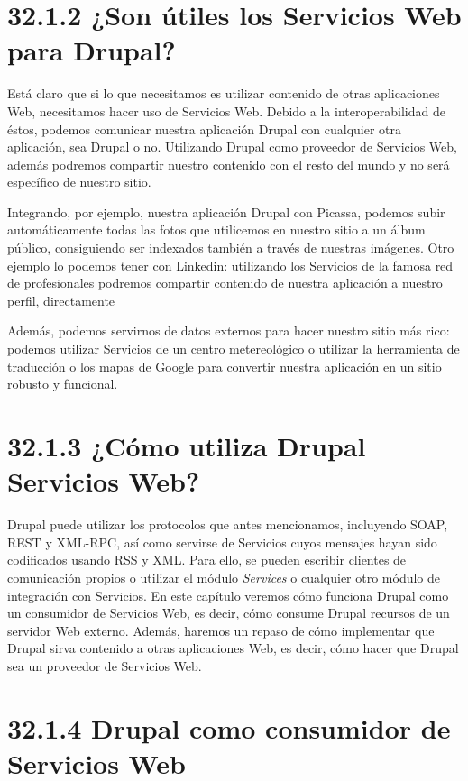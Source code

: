 \section{\Large{32.1.2 ¿Son útiles los Servicios Web para Drupal?}}

Está claro que si lo que necesitamos es utilizar contenido de otras aplicaciones Web, necesitamos hacer 
uso de Servicios Web. Debido a la interoperabilidad de éstos, podemos comunicar nuestra aplicación Drupal 
con cualquier otra aplicación, sea Drupal o no. Utilizando Drupal como proveedor de Servicios Web, además 
podremos compartir nuestro contenido con el resto del mundo y no será específico de nuestro sitio.
 
Integrando, por ejemplo, nuestra aplicación Drupal con Picassa, podemos subir automáticamente todas las 
fotos que utilicemos en nuestro sitio a un álbum público, consiguiendo ser indexados también a través de 
nuestras imágenes. Otro ejemplo lo podemos tener con Linkedin: utilizando los Servicios de la famosa red de 
profesionales podremos compartir contenido de nuestra aplicación a nuestro perfil, directamente  

Además, podemos servirnos de datos externos para hacer nuestro sitio más rico: podemos utilizar Servicios 
de un centro metereológico o utilizar la herramienta de traducción o los mapas de Google para 
convertir nuestra aplicación en un sitio robusto y funcional. 

\section{\Large{32.1.3 ¿Cómo utiliza Drupal Servicios Web?}}

Drupal puede utilizar los protocolos que antes mencionamos, incluyendo SOAP, REST y XML-RPC, así como 
servirse de Servicios cuyos mensajes hayan sido codificados usando RSS y XML. Para ello, se pueden escribir 
clientes de comunicación propios o utilizar el módulo \textit{Services} o cualquier otro módulo de integración 
con Servicios. En este capítulo veremos cómo funciona Drupal como un consumidor de Servicios Web, es decir, 
cómo consume Drupal recursos de un servidor Web externo. Además, haremos un repaso de cómo implementar que Drupal sirva contenido a otras aplicaciones Web, 
es decir, cómo hacer que Drupal sea un proveedor de Servicios Web.

\section{\Large{32.1.4 Drupal como consumidor de Servicios Web}}

